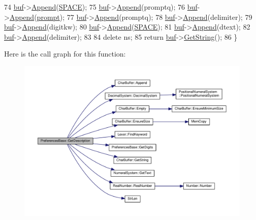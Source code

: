 \begin{DoxyCode}
74     \hyperlink{classPreferencesBase_a56ccdce81b9347c99eacb1839cee0a49}{buf}->\hyperlink{classCharBuffer_a045b38735f7b3007c1b98d3d7b7feafe}{Append}(\hyperlink{platform_8h_a5ff6e798033f03e74730e99f01936f84}{SPACE});
75     \hyperlink{classPreferencesBase_a56ccdce81b9347c99eacb1839cee0a49}{buf}->\hyperlink{classCharBuffer_a045b38735f7b3007c1b98d3d7b7feafe}{Append}(promptq);
76     \hyperlink{classPreferencesBase_a56ccdce81b9347c99eacb1839cee0a49}{buf}->\hyperlink{classCharBuffer_a045b38735f7b3007c1b98d3d7b7feafe}{Append}(\hyperlink{classPreferencesBase_a88a6af58103e0498c366d61a628312e0}{prompt});
77     \hyperlink{classPreferencesBase_a56ccdce81b9347c99eacb1839cee0a49}{buf}->\hyperlink{classCharBuffer_a045b38735f7b3007c1b98d3d7b7feafe}{Append}(promptq);
78     \hyperlink{classPreferencesBase_a56ccdce81b9347c99eacb1839cee0a49}{buf}->\hyperlink{classCharBuffer_a045b38735f7b3007c1b98d3d7b7feafe}{Append}(delimiter);
79     \hyperlink{classPreferencesBase_a56ccdce81b9347c99eacb1839cee0a49}{buf}->\hyperlink{classCharBuffer_a045b38735f7b3007c1b98d3d7b7feafe}{Append}(digitkw);
80     \hyperlink{classPreferencesBase_a56ccdce81b9347c99eacb1839cee0a49}{buf}->\hyperlink{classCharBuffer_a045b38735f7b3007c1b98d3d7b7feafe}{Append}(\hyperlink{platform_8h_a5ff6e798033f03e74730e99f01936f84}{SPACE});
81     \hyperlink{classPreferencesBase_a56ccdce81b9347c99eacb1839cee0a49}{buf}->\hyperlink{classCharBuffer_a045b38735f7b3007c1b98d3d7b7feafe}{Append}(dtext);
82     \hyperlink{classPreferencesBase_a56ccdce81b9347c99eacb1839cee0a49}{buf}->\hyperlink{classCharBuffer_a045b38735f7b3007c1b98d3d7b7feafe}{Append}(delimiter);
83 
84     \textcolor{keyword}{delete} ns;
85     \textcolor{keywordflow}{return} \hyperlink{classPreferencesBase_a56ccdce81b9347c99eacb1839cee0a49}{buf}->\hyperlink{classCharBuffer_a7dfd3feaaf80f318ba44efe15b1ec44b}{GetString}();
86 \}
\end{DoxyCode}


Here is the call graph for this function\+:
\nopagebreak
\begin{figure}[H]
\begin{center}
\leavevmode
\includegraphics[width=350pt]{da/de5/classPreferencesBase_a9452038c67c6592334b6f3908c86833a_cgraph}
\end{center}
\end{figure}




